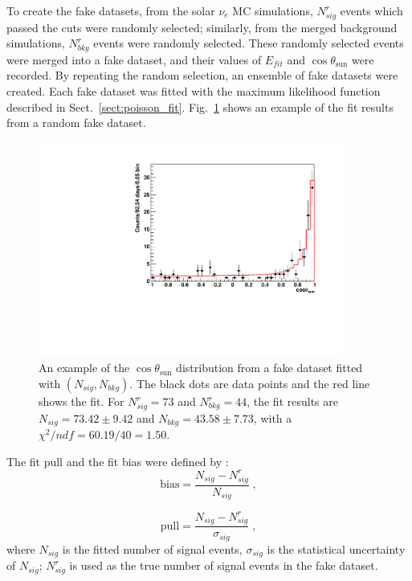 To create the fake datasets, from the solar $\nu_e$ MC simulations, $N^r_{sig}$ events which passed the cuts were randomly selected; similarly, from the merged background simulations, $N^r_{bkg}$ events were randomly selected. These randomly selected events were merged into a fake dataset, and their values of $E_{fit}$ and $\cos\theta_\mathrm{sun}$ were recorded.
By repeating the random selection, an ensemble of fake datasets were created. Each fake dataset was fitted with the maximum likelihood function described in Sect.~\ref{sect:poisson_fit}. Fig.~\ref{ensemble_test} shows an example of the fit results from a random fake dataset.

\begin{figure}[!htb]
	\centering
	\includegraphics[width=10cm]{ensemble_fitExample.pdf}
	\caption[An example of the $\cos\theta_\mathrm{sun}$ distribution fitted with $(N_{sig},N_{bkg})$.]{An example of the $\cos\theta_\mathrm{sun}$ distribution from a fake dataset fitted with $(N_{sig},N_{bkg})$. The black dots are data points and the red line shows the fit. For $N^r_{sig} = 73$ and $N^r_{bkg}=44$, the fit results are $N_{sig} = 73.42\pm9.42$ and $N_{bkg} = 43.58 \pm 7.73$, with a $\chi^2/ndf = 60.19/40 = 1.50$.	\label{ensemble_test}}
\end{figure} 

The fit pull and the fit bias were defined by \cite{leta}:
\begin{equation}
\mathrm{bias}=\frac{N_{sig}-N^r_{sig}}{N_{sig}}\; ,
\end{equation}

\begin{equation}
\mathrm{pull}=\frac{N_{sig}-N^r_{sig}}{\sigma_{sig}}\; ,
\end{equation}
where $N_{sig}$ is the fitted number of signal events, $\sigma_{sig}$ is the statistical uncertainty of $N_{sig}$; $N^{r}_{sig}$ is used as the true number of signal events in the fake dataset.

